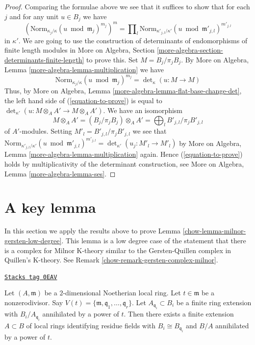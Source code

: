 \begin{proof}
\medskip\noindent
Comparing the formulae above we see that it suffices to show that
for each $j$ and for any unit $u \in B_j$ we have
\begin{equation}
\label{equation-to-prove}
\left(\text{Norm}_{\kappa_j/\kappa}(u \bmod \mathfrak m_j)^{m_j}\right)^m
=
\prod\nolimits_l
\text{Norm}_{\kappa'_{j, l}/\kappa'}(u \bmod \mathfrak m'_{j, l})^{m'_{j, l}}
\end{equation}
in $\kappa'$. We are going to use the construction of determinants of
endomorphisms of finite length modules in
More on Algebra, Section \ref{more-algebra-section-determinants-finite-length}
to prove this. Set $M = B_j/\pi_j B_j$. By
More on Algebra, Lemma \ref{more-algebra-lemma-multiplication} we have
$$
\text{Norm}_{\kappa_j/\kappa}(u \bmod \mathfrak m_j)^{m_j} =
\det\nolimits_\kappa(u : M \to M)
$$
Thus, by
More on Algebra, Lemma \ref{more-algebra-lemma-flat-base-change-det},
the left hand side of (\ref{equation-to-prove}) is equal to
$\det_{\kappa'}(u : M \otimes_A A' \to M \otimes_A A')$.
We have an isomorphism
$$
M \otimes_A A' = (B_j/\pi_j B_j) \otimes_A A' =
\bigoplus\nolimits_l B'_{j, l}/\pi_j B'_{j, l}
$$
of $A'$-modules. Setting $M'_l = B'_{j, l}/\pi_j B'_{j, l}$ we see that
$\text{Norm}_{\kappa'_{j, l}/\kappa'}(u \bmod \mathfrak m'_{j, l})^{m'_{j, l}}
= \det_{\kappa'}(u_j : M'_l \to M'_l)$ by
More on Algebra, Lemma \ref{more-algebra-lemma-multiplication} again.
Hence (\ref{equation-to-prove}) holds by multiplicativity of the determinant
construction, see More on Algebra, Lemma \ref{more-algebra-lemma-ses}.
\end{proof}

\section{A key lemma}
\label{chow-section-key-lemma}
In this section we apply the results above to prove
Lemma \ref{chow-lemma-milnor-gersten-low-degree}.
This lemma is a low degree case of the statement
that there is a complex for Milnor K-theory similar
to the Gersten-Quillen complex in Quillen's K-theory.
See Remark \ref{chow-remark-gersten-complex-milnor}.

\begin{lemma}
\label{chow-lemma-perpare-key}
\href{https://stacks.math.columbia.edu/tag/0EAV}{\texttt{Stacks tag 0EAV}}

Let $(A, \mathfrak m)$ be a $2$-dimensional Noetherian local ring.
Let $t \in \mathfrak m$ be a nonzerodivisor. Say
$V(t) = \{\mathfrak m, \mathfrak q_1, \ldots, \mathfrak q_r\}$.
Let $A_{\mathfrak q_i} \subset B_i$ be a finite ring
extension with $B_i/A_{\mathfrak q_i}$ annihilated by a power of
$t$. Then there exists a finite extension $A \subset B$ of
local rings identifying residue fields
with $B_i \cong B_{\mathfrak q_i}$ and $B/A$ annihilated
by a power of $t$.
\end{lemma}

